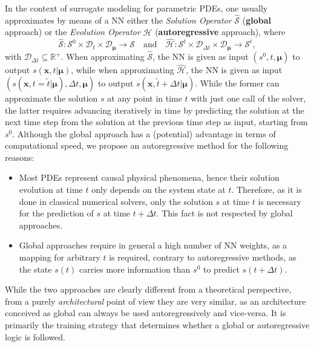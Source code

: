 In the context of surrogate modeling for parametric PDEs, one usually approximates by means of a NN either the \textit{Solution Operator} $\hat{\mathcal{S}}$ (\textbf{global} approach) or the \textit{Evolution Operator} $\hat{\mathcal{H}}$ (\textbf{autoregressive} approach), where 
\begin{equation}
\hat{\mathcal{S}}:\mathcal{S}^0\times\mathcal{D}_{t}\times\mathcal{D}_{\pmb{\mu}}\rightarrow\mathcal{S}\quad\text{and}\quad \hat{\mathcal{H}}:\mathcal{S}^t\times\mathcal{D}_{\Delta t}\times\mathcal{D}_{\pmb{\mu}}\rightarrow\mathcal{S}^t,
\label{eq:global&auto_op}
\end{equation}
with $\mathcal{D}_{\Delta t}\subseteq\mathbb{R}^+$. When approximating $\hat{\mathcal{S}}$, the NN is given as input $(s^0,t,\pmb{\mu})$ to output $s(\mathbf{x},t|\pmb{\mu})$, while when approximating $\hat{\mathcal{H}}$, the NN is given as input $(s(\mathbf{x},t=\tilde{t}|\pmb{\mu}), \Delta t, \pmb{\mu})$ to output $s(\mathbf{x},\tilde{t}+\Delta t|\pmb{\mu})$. While the former can approximate the solution $s$ at any point in time $t$ with just one call of the solver, the latter requires advancing iteratively in time by predicting the solution at the next time step from the solution at the previous time step as input, starting from $s^0$. Although the global approach has a (potential) advantage in terms of computational speed, we propose an autoregressive method for the following reasons:
\begin{itemize}
    \item Most PDEs represent causal physical phenomena, hence their solution evolution at time $t$ only depends on the system state at $t$. Therefore, as it is done in classical numerical solvers, only the solution $s$ at time $t$ is necessary for the prediction of $s$ at time $t+\Delta t$. This fact is not respected by global approaches.
    \item Global approaches require in general a high number of NN weights, as a mapping for arbitrary $t$ is required, contrary to autoregressive methods, as the state $s(t)$ carries more information than $s^0$ to predict $s(t+\Delta t)$.
\end{itemize}
While the two approaches are clearly different from a theoretical perspective, from a purely \textit{architectural} point of view they are very similar, as an architecture conceived as global can always be used autoregressively and vice-versa. It is primarily the training strategy that determines whether a global or autoregressive logic is followed.


